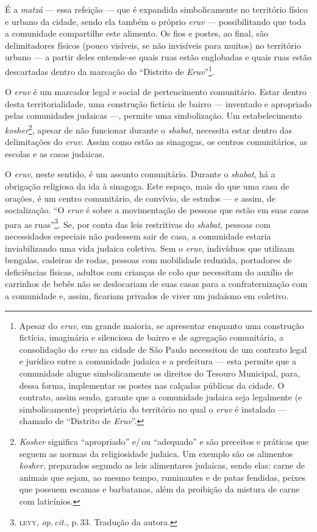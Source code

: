 É a \emph{matzá} --- essa refeição --- que é expandida simbolicamente no
território físico e urbano da cidade, sendo ela também o próprio
\emph{eruv} --- possibilitando que toda a comunidade compartilhe este
alimento. Os fios e postes, ao final, são delimitadores físicos (pouco
visíveis, se não invisíveis para muitos) no território urbano --- a
partir deles entende-se quais ruas estão englobadas e quais ruas estão
descartadas dentro da marcação do ``Distrito de
\emph{Eruv}''\footnote{Apesar do \emph{eruv}, em grande maioria, se
  apresentar enquanto uma construção fictícia, imaginária e silenciosa
  de bairro e de agregação comunitária, a consolidação do \emph{eruv} na
  cidade de São Paulo necessitou de um contrato legal e jurídico entre a
  comunidade judaica e a prefeitura --- esta permite que a comunidade
  alugue simbolicamente os direitos do Tesouro Municipal, para, dessa
  forma, implementar os postes nas calçadas públicas da cidade. O
  contrato, assim sendo, garante que a comunidade judaica seja
  legalmente (e simbolicamente) proprietária do território no qual o
  \emph{eruv} é instalado --- chamado de ``Distrito de \emph{Eruv}''.}.

O \emph{eruv} é um marcador legal e social de pertencimento comunitário.
Estar dentro desta territorialidade, uma construção fictícia de bairro
--- inventado e apropriado pelas comunidades judaicas ---, permite uma
simbolização. Um estabelecimento \emph{kosher}\footnote{\emph{Kosher}
  significa ``apropriado'' e/\,ou ``adequado'' e são preceitos e práticas
  que seguem as normas da religiosidade judaica. Um exemplo são os
  alimentos \emph{kosher}, preparados segundo as leis alimentares
  judaicas, sendo elas: carne de animais que sejam, ao mesmo tempo,
  ruminantes e de patas fendidas, peixes que possuem escamas e
  barbatanas, além da proibição da mistura de carne com laticínios.},
apesar de não funcionar durante o \emph{shabat}, necessita estar dentro
das delimitações do \emph{eruv}. Assim como estão as sinagogas, os
centros comunitários, as escolas e as casas judaicas.

O \emph{eruv}, neste sentido, é um assunto comunitário. Durante o
\emph{shabat}, há a obrigação religiosa da ida à sinagoga. Este espaço,
mais do que uma casa de orações, é um centro comunitário, de convívio,
de estudos --- e assim, de socialização. ``O \emph{eruv} é sobre a
movimentação de pessoas que estão em suas casas para as
ruas''\footnote{\textsc{levy}, \emph{op.\,cit.}, p.\,33. Tradução da autora.}. Se, por conta
das leis restritivas do \emph{shabat}, pessoas com necessidades
especiais não pudessem sair de casa, a comunidade estaria inviabilizando
uma vida judaica coletiva. Sem o \emph{eruv}, indivíduos que utilizam
bengalas, cadeiras de rodas, pessoas com mobilidade reduzida, portadores
de deficiências físicas, adultos com crianças de colo que necessitam do
auxílio de carrinhos de bebês não se deslocariam de suas casas para a
confraternização com a comunidade e, assim, ficariam privados de viver
um judaísmo em coletivo.

